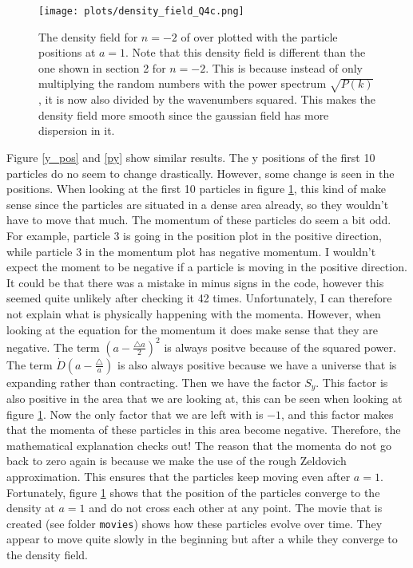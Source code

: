 \begin{figure}[h]
\centering
\texttt{[image: plots/density\_field\_Q4c.png]}
\caption{The density field for $n=-2$ of over plotted with the particle positions at $a = 1$. Note that this density field is different than the one shown in section 2 for $n=-2$. This is because instead of only multiplying the random numbers with the power spectrum $\sqrt{P(k)}$, it is now also divided by the wavenumbers squared. This makes the density field more smooth since the gaussian field has more dispersion in it.}
\label{field_scatter}
\end{figure}
\newpage
Figure \ref{y_pos} and \ref{py} show similar results. The y positions of the first 10 particles do no seem to change drastically. However, some change is seen in the positions. When looking at the first 10 particles in figure \ref{field_scatter}, this kind of make sense since the particles are situated in a dense area already, so they wouldn't have to move that much. The momentum of these particles do seem a bit odd. For example, particle 3 is going in the position plot in the positive direction, while particle 3 in the momentum plot has negative momentum. I wouldn't expect the moment to be negative if a particle is moving in the positive direction. It could be that there was a mistake in minus signs in the code, however this seemed quite unlikely after checking it 42 times. Unfortunately, I can therefore not explain what is physically happening with the momenta. However, when looking at the equation for the momentum it does make sense that they are negative. The term $(a - \frac{\triangle a}{2})^2$ is always positve because of the squared power. The term $\dot{D}(a-\frac{\triangle}{a})$ is also always positive because we have a universe that is expanding rather than contracting. Then we have the factor $S_y$. This factor is also positive in the area that we are looking at, this can be seen when looking at figure \ref{field_scatter}. Now the only factor that we are left with is $-1$, and this factor makes that the momenta of these particles in this area become negative. Therefore, the mathematical explanation checks out! The reason that the momenta do not go back to zero again is because we make the use of the rough Zeldovich approximation. This ensures that the particles keep moving even after $a=1$. Fortunately, figure \ref{field_scatter} shows that the position of the particles converge to the density at $a=1$ and do not cross each other at any point. The movie that is created (see folder \texttt{movies}) shows how these particles evolve over time. They appear to move quite slowly in the beginning but after a while they converge to the density field. 


